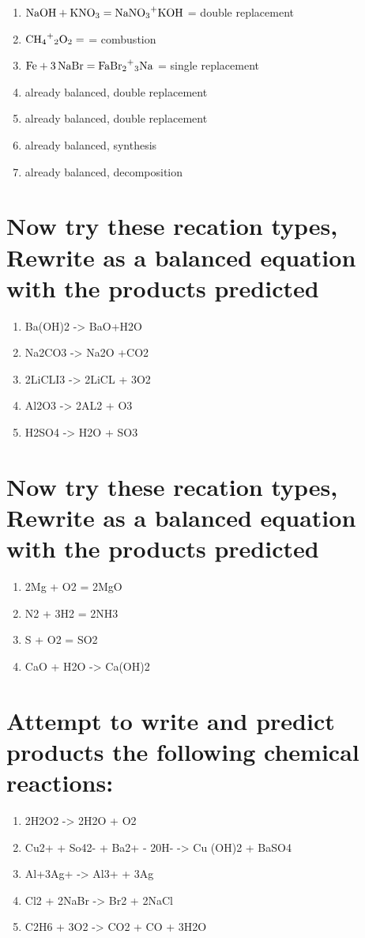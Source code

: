 \documentclass{scrartcl}
\begin{document}
\begin{enumerate}
\item \(\ce{NaOH + KNO3}=\ce{NaNO3+KOH}\) = double replacement
\item \(\ce{CH4+2O2}=\ce{}\) = combustion
\item \(\ce{Fe + 3NaBr}=\ce{FaBr2+3Na}\) = single replacement
\item already balanced, double replacement
\item already balanced, double replacement
\item already balanced, synthesis
\item already balanced, decomposition
\end{enumerate}

\section{Now try these recation types, Rewrite as a balanced equation with the products predicted}
\label{sec:orgb5135a3}
\begin{enumerate}
\item Ba(OH)2 -> BaO+H2O
\item Na2CO3 -> Na2O +CO2
\item 2LiCLI3 -> 2LiCL + 3O2
\item Al2O3 -> 2AL2 + O3
\item H2SO4 -> H2O + SO3
\end{enumerate}

\section{Now try these recation types, Rewrite as a balanced equation with the products predicted}
\label{sec:org9549a98}

\begin{enumerate}
\item 2Mg + O2 = 2MgO
\item N2 + 3H2 = 2NH3
\item S + O2 = SO2
\item CaO + H2O -> Ca(OH)2
\end{enumerate}

\section{Attempt to write and predict products the following chemical reactions:}
\label{sec:orgfdf733e}
\begin{enumerate}
\item 2H2O2 -> 2H2O + O2
\item Cu2+ + So42- + Ba2+ - 20H- -> Cu (OH)2 + BaSO4
\item Al+3Ag+ -> Al3+ + 3Ag
\item Cl2 + 2NaBr -> Br2 + 2NaCl
\item C2H6 + 3O2 -> CO2 + CO + 3H2O
\end{enumerate}
\end{document}
